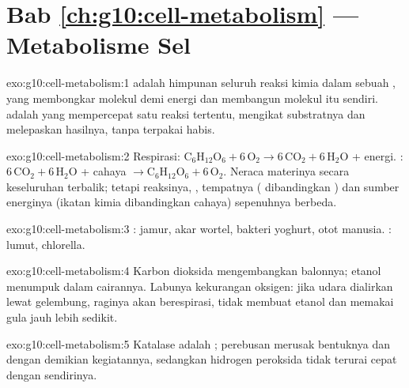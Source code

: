 \section*{Bab \ref{ch:g10:cell-metabolism} --- Metabolisme Sel}

\begin{solution}{exo:g10:cell-metabolism:1}
 adalah himpunan seluruh reaksi kimia dalam sebuah , yang
membongkar molekul demi energi dan membangun molekul  itu sendiri.
 adalah  yang mempercepat satu reaksi tertentu, mengikat
substratnya dan melepaskan hasilnya, tanpa terpakai habis.
\end{solution}

\begin{solution}{exo:g10:cell-metabolism:2}
Respirasi: $\mathrm{C_6H_{12}O_6} + 6\,\mathrm{O_2} \to
6\,\mathrm{CO_2} + 6\,\mathrm{H_2O}$ + energi. :
$6\,\mathrm{CO_2} + 6\,\mathrm{H_2O}$ + cahaya $\to \mathrm{C_6H_{12}O_6}
+ 6\,\mathrm{O_2}$. Neraca materinya secara keseluruhan terbalik;
tetapi reaksinya, , tempatnya ( dibandingkan
) dan sumber energinya (ikatan kimia dibandingkan cahaya)
sepenuhnya berbeda.
\end{solution}

\begin{solution}{exo:g10:cell-metabolism:3}
: jamur,  akar wortel, bakteri yoghurt,  otot manusia.
: lumut, chlorella.
\end{solution}

\begin{solution}{exo:g10:cell-metabolism:4}
Karbon dioksida mengembangkan balonnya; etanol menumpuk dalam
cairannya. Labunya kekurangan oksigen: jika udara dialirkan lewat
gelembung, raginya akan berespirasi, tidak membuat etanol dan memakai
gula jauh lebih sedikit.
\end{solution}

\begin{solution}{exo:g10:cell-metabolism:5}
Katalase adalah ; perebusan merusak bentuknya dan dengan
demikian kegiatannya, sedangkan hidrogen peroksida tidak terurai cepat
dengan sendirinya.
\end{solution}

